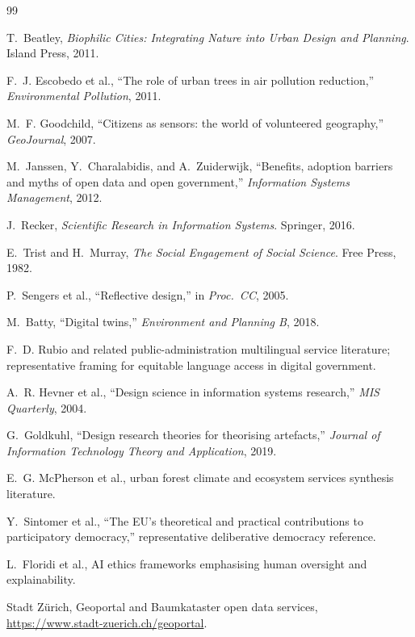 \documentclass[12pt,a4paper]{article}
\begin{document}
\begin{thebibliography}{99}

T.~Beatley, \emph{Biophilic Cities: Integrating Nature into Urban Design and Planning}. Island Press, 2011.

F.~J. Escobedo et al., ``The role of urban trees in air pollution reduction,'' \emph{Environmental Pollution}, 2011.

M.~F. Goodchild, ``Citizens as sensors: the world of volunteered geography,'' \emph{GeoJournal}, 2007.

M.~Janssen, Y.~Charalabidis, and A.~Zuiderwijk, ``Benefits, adoption barriers and myths of open data and open government,'' \emph{Information Systems Management}, 2012.

J.~Recker, \emph{Scientific Research in Information Systems}. Springer, 2016.

E.~Trist and H.~Murray, \emph{The Social Engagement of Social Science}. Free Press, 1982.

P.~Sengers et al., ``Reflective design,'' in \emph{Proc.\ CC}, 2005.

M.~Batty, ``Digital twins,'' \emph{Environment and Planning B}, 2018.

F.~D. Rubio and related public-administration multilingual service literature; representative framing for equitable language access in digital government.

A.~R. Hevner et al., ``Design science in information systems research,'' \emph{MIS Quarterly}, 2004.

G.~Goldkuhl, ``Design research theories for theorising artefacts,'' \emph{Journal of Information Technology Theory and Application}, 2019.

E.~G. McPherson et al., urban forest climate and ecosystem services synthesis literature.

Y.~Sintomer et al., ``The EU's theoretical and practical contributions to participatory democracy,'' representative deliberative democracy reference.

L.~Floridi et al., AI ethics frameworks emphasising human oversight and explainability.

Stadt Zürich, Geoportal and Baumkataster open data services, \url{https://www.stadt-zuerich.ch/geoportal}.

\end{thebibliography}
\end{document}
